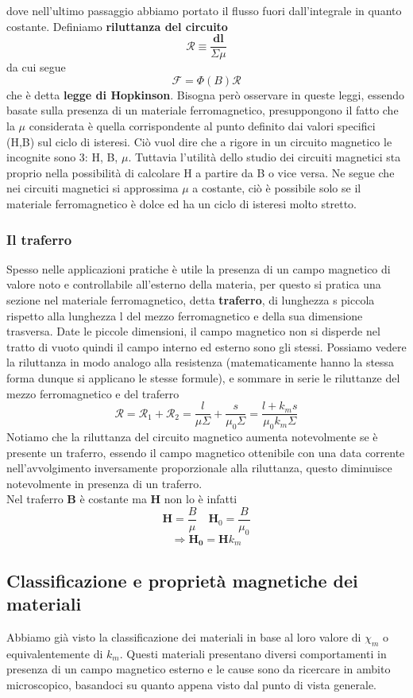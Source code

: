 \documentclass[
10pt, %
a4paper, %
oneside, %
headinclude,footinclude, %
BCOR5mm, %
]{scrartcl}
\begin{document}
dove nell'ultimo passaggio abbiamo portato il flusso fuori dall'integrale in quanto costante. Definiamo \textbf{riluttanza del circuito}
\[\mathcal{R}\equiv\frac{\mathbf{dl}}{\Sigma\mu} \]
da cui segue
\[\mathcal{F}=\Phi(B)\mathcal{R}\]
che è detta \textbf{legge di Hopkinson}. Bisogna però osservare in queste leggi, essendo basate sulla presenza di un materiale ferromagnetico, presuppongono il fatto che la $\mu$ considerata è quella corrispondente al punto definito dai valori specifici (H,B) sul ciclo di isteresi. Ciò vuol dire che a rigore in un circuito magnetico le incognite sono 3: H, B, $\mu$. Tuttavia l'utilità dello studio dei circuiti magnetici sta proprio nella possibilità di calcolare H a partire da B o vice versa. Ne segue che nei circuiti magnetici si approssima $\mu$ a costante, ciò è possibile solo se il materiale ferromagnetico è dolce ed ha un ciclo di isteresi molto stretto. 
\subsubsection*{Il traferro}
Spesso nelle applicazioni pratiche è utile la presenza di un campo magnetico di valore noto e controllabile all'esterno della materia, per questo si pratica una sezione nel materiale ferromagnetico, detta \textbf{traferro}, di lunghezza s piccola rispetto alla lunghezza l del mezzo ferromagnetico e della sua dimensione trasversa. Date le piccole dimensioni, il campo magnetico non si disperde nel tratto di vuoto quindi il campo interno ed esterno sono gli stessi. Possiamo vedere la riluttanza in modo analogo alla resistenza (matematicamente hanno la stessa forma dunque si applicano le stesse formule), e sommare in serie le riluttanze del mezzo ferromagnetico e del traferro
\[\mathcal{R} = \mathcal{R}_1 + \mathcal{R}_2 = \frac{l}{\mu \Sigma}+\frac{s}{\mu_0\Sigma} = \frac{l+k_m s}{\mu_0 k_m\Sigma}\]
Notiamo che la riluttanza del circuito magnetico aumenta notevolmente se è presente un traferro, essendo il campo magnetico ottenibile con una data corrente nell'avvolgimento inversamente proporzionale alla riluttanza, questo diminuisce notevolmente in presenza di un traferro.\\
Nel traferro \(\mathbf{B}\) è costante ma \(\mathbf{H}\) non lo è infatti
\[\mathbf{H} = \frac{B}{\mu}\quad \mathbf{H}_0 = \frac{B}{\mu_0}\]
\[\Rightarrow \mathbf{H_0} = \mathbf{H}k_m\]
\subsection{Classificazione e proprietà magnetiche dei materiali}
Abbiamo già visto la classificazione dei materiali in base al loro valore di $\chi_m$ o equivalentemente di \(k_m\). Questi materiali presentano diversi comportamenti in presenza di un campo magnetico esterno e le cause sono da ricercare in ambito microscopico, basandoci su quanto appena visto dal punto di vista generale.
\end{document}

